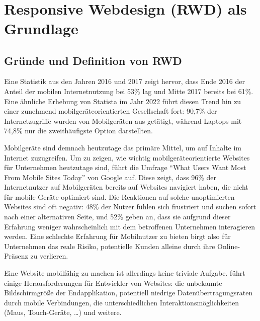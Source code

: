 \newpage
\
\newpage


\section{Responsive Webdesign (RWD) als Grundlage}\label{sec:responsive-webdesign-rwd-als-grundlage}

\subsection{Gründe und Definition von RWD}\label{subsec:grunde-und-definition-von-rwd}

Eine Statistik aus den Jahren 2016 und 2017 \autocite{statista.GWI.2017} zeigt hervor, dass Ende 2016 der Anteil der mobilen Internetnutzung bei 53\% lag und Mitte 2017 bereits bei 61\%.
Eine ähnliche Erhebung von Statista \autocite{statista.DataReportal.WeAreSocial.Hootsuite.2023} im Jahr 2022 führt diesen Trend hin zu einer zunehmend mobilgeräteorientierten Gesellschaft fort:
90,7\% der Internetzugriffe wurden von Mobilgeräten aus getätigt, während Laptops mit 74,8\% nur die zweithäufigste Option darstellten.

Mobilgeräte sind demnach heutzutage das primäre Mittel, um auf Inhalte im Internet zuzugreifen.
Um zu zeigen, wie wichtig mobilgeräteorientierte Websites für Unternehmen heutzutage sind, führt \autocite[S. 25]{Harmsen.2018} die Umfrage "`What Users Want Most From Mobile Sites Today"' von Google \autocite{Google.WhatUsersWantFromMobile.2012} auf.
Diese zeigt, dass 96\% der Internetnutzer auf Mobilgeräten bereits auf Websites navigiert haben, die nicht für mobile Geräte optimiert sind.
Die Reaktionen auf solche unoptimierten Websites sind oft negativ: 48\% der Nutzer fühlen sich frustriert und suchen sofort nach einer alternativen Seite, und 52\% geben an, dass sie aufgrund dieser Erfahrung weniger wahrscheinlich mit dem betroffenen Unternehmen interagieren werden.
Eine schlechte Erfahrung für Mobilnutzer zu bieten birgt also für Unternehmen das reale Risiko, potentielle Kunden alleine durch ihre Online-Präsenz zu verlieren.

Eine Website mobilfähig zu machen ist allerdings keine triviale Aufgabe.
\autocite[S. 25-33]{Harmsen.2018} führt einige Herausforderungen für Entwickler von Websites:
die unbekannte Bildschirmgröße der Endapplikation, potentiell niedrige Datenübertragungsraten durch mobile Verbindungen, die unterschiedlichen Interaktionsmöglichkeiten (Maus, Touch-Geräte, \ldots) und weitere.

